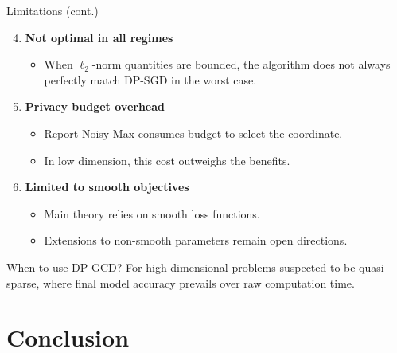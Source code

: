 \documentclass[10pt]{beamer}
\begin{document}
\begin{frame}{Limitations (cont.)}
\begin{enumerate}
\setcounter{enumi}{3}

\item \textbf{Not optimal in all regimes}
\begin{itemize}
\item When $\ell_2$-norm quantities are bounded, the algorithm does not always perfectly match DP-SGD in the worst case.
\end{itemize}

\item \textbf{Privacy budget overhead}
\begin{itemize}
\item Report-Noisy-Max consumes budget to select the coordinate.
\item In low dimension, this cost outweighs the benefits.
\end{itemize}

\item \textbf{Limited to smooth objectives}
\begin{itemize}
\item Main theory relies on smooth loss functions.
\item Extensions to non-smooth parameters remain open directions.
\end{itemize}
\end{enumerate}

\vspace{1em}
\begin{block}{When to use DP-GCD?}
For high-dimensional problems suspected to be quasi-sparse, where final model accuracy prevails over raw computation time.
\end{block}
\end{frame}

\section{Conclusion}
\end{document}
